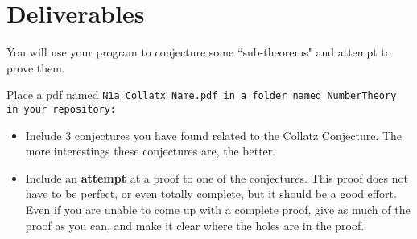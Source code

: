 \documentclass{article}
\newcommand\foldername{\tt{NumberTheory} }
\begin{document}
\section*{Deliverables}
	
	You will use your program to conjecture some ``sub-theorems" and attempt to prove them.  
	
	Place a pdf named \tt{N1a\_Collatx\_Name.pdf}  in a folder named \foldername in your repository:
	\begin{itemize}
		\item Include 3 conjectures you have found related to the Collatz Conjecture.  The more interestings these conjectures are, the better.
		\item Include an \textbf{attempt} at a proof to one of the conjectures.  This proof does not have to be perfect, or even totally complete, but it should be a good effort.  Even if you are unable to come up with a complete proof, give as much of the proof as you can, and make it clear where the holes are in the proof.
	\end{itemize}

	
\end{document}
